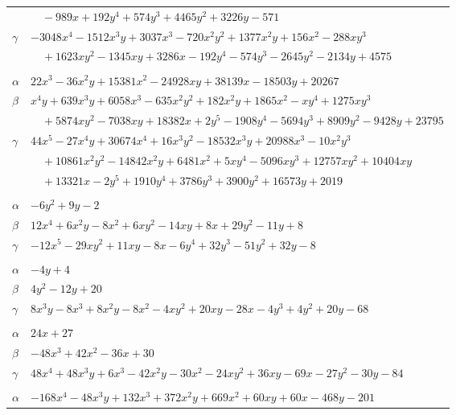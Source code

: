 \documentclass[11pt]{article}
\begin{document}
\begin{longtable}{@{}ll@{}}
 & $\quad -989x+192y^{4}+574y^{3}+4465y^{2}+3226y-571$\\
$\gamma$ & $-3048x^{4}-1512x^{3}y+3037x^{3}-720x^{2}y^{2}+1377x^{2}y+156x^{2}-288xy^{3}$\\
 & $\quad +1623xy^{2}-1345xy+3286x-192y^{4}-574y^{3}-2645y^{2}-2134y+4575$\\
\addlinespace[3pt]
\multicolumn{2}{@{}l}{$\{i,j\}=\{3,77\}$, $k_{ij}=2^{3}\cdot 3^{2}\cdot 7^{2}$}\\
$\alpha$ & $22x^{3}-36x^{2}y+15381x^{2}-24928xy+38139x-18503y+20267$\\
$\beta$ & $x^{4}y+639x^{3}y+6058x^{3}-635x^{2}y^{2}+182x^{2}y+1865x^{2}-xy^{4}+1275xy^{3}$\\
 & $\quad +5874xy^{2}-7038xy+18382x+2y^{5}-1908y^{4}-5694y^{3}+8909y^{2}-9428y+23795$\\
$\gamma$ & $44x^{5}-27x^{4}y+30674x^{4}+16x^{3}y^{2}-18532x^{3}y+20988x^{3}-10x^{2}y^{3}$\\
 & $\quad +10861x^{2}y^{2}-14842x^{2}y+6481x^{2}+5xy^{4}-5096xy^{3}+12757xy^{2}+10404xy$\\
 & $\quad +13321x-2y^{5}+1910y^{4}+3786y^{3}+3900y^{2}+16573y+2019$\\
\addlinespace[3pt]
\multicolumn{2}{@{}l}{$\{i,j\}=\{3,99\}$, $k_{ij}=2$}\\
$\alpha$ & $-6y^{2}+9y-2$\\
$\beta$ & $12x^{4}+6x^{2}y-8x^{2}+6xy^{2}-14xy+8x+29y^{2}-11y+8$\\
$\gamma$ & $-12x^{5}-29xy^{2}+11xy-8x-6y^{4}+32y^{3}-51y^{2}+32y-8$\\
\addlinespace[3pt]
\multicolumn{2}{@{}l}{$\{i,j\}=\{4,26\}$, $k_{ij}=2^{2}\cdot 3\cdot 7$}\\
$\alpha$ & $-4y+4$\\
$\beta$ & $4y^{2}-12y+20$\\
$\gamma$ & $8x^{3}y-8x^{3}+8x^{2}y-8x^{2}-4xy^{2}+20xy-28x-4y^{3}+4y^{2}+20y-68$\\
\addlinespace[3pt]
\multicolumn{2}{@{}l}{$\{i,j\}=\{4,27\}$, $k_{ij}=3$}\\
$\alpha$ & $24x+27$\\
$\beta$ & $-48x^{3}+42x^{2}-36x+30$\\
$\gamma$ & $48x^{4}+48x^{3}y+6x^{3}-42x^{2}y-30x^{2}-24xy^{2}+36xy-69x-27y^{2}-30y-84$\\
\addlinespace[3pt]
\multicolumn{2}{@{}l}{$\{i,j\}=\{4,37\}$, $k_{ij}=2^{2}\cdot 3^{3}$}\\
$\alpha$ & $-168x^{4}-48x^{3}y+132x^{3}+372x^{2}y+669x^{2}+60xy+60x-468y-201$\\

\end{longtable}
\end{document}
